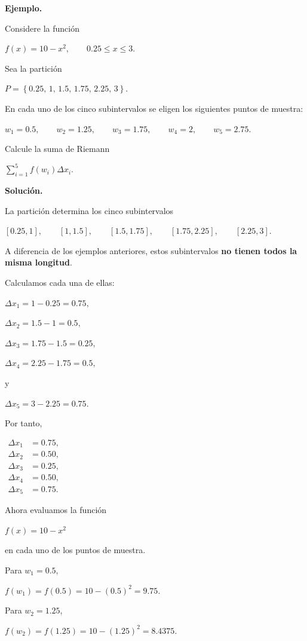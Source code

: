 \documentclass[12pt]{article}
\newenvironment{Ejem}
{\par\medskip\noindent\textbf{Ejemplo.}\ }
{\par\medskip}
\begin{document}
\begin{Ejem}

Considere la función

$
f(x)=10-x^2,
\qquad
0.25\leq x\leq 3.
$

Sea la partición

$
P=
\left\{
0.25,\,
1,\,
1.5,\,
1.75,\,
2.25,\,
3
\right\}.
$

En cada uno de los cinco subintervalos se eligen los siguientes
puntos de muestra:

$
w_1=0.5,
\qquad
w_2=1.25,
\qquad
w_3=1.75,
\qquad
w_4=2,
\qquad
w_5=2.75.
$

Calcule la suma de Riemann

$
\sum_{i=1}^{5}f(w_i)\Delta x_i.
$

\textbf{Solución.}

La partición determina los cinco subintervalos

$
[0.25,1],
\qquad
[1,1.5],
\qquad
[1.5,1.75],
\qquad
[1.75,2.25],
\qquad
[2.25,3].
$

A diferencia de los ejemplos anteriores, estos subintervalos
\textbf{no tienen todos la misma longitud}.

Calculamos cada una de ellas:

$
\Delta x_1
=
1-0.25
=
0.75,
$

$
\Delta x_2
=
1.5-1
=
0.5,
$

$
\Delta x_3
=
1.75-1.5
=
0.25,
$

$
\Delta x_4
=
2.25-1.75
=
0.5,
$

y

$
\Delta x_5
=
3-2.25
=
0.75.
$

Por tanto,

$
\begin{aligned}
\Delta x_1&=0.75,\\
\Delta x_2&=0.50,\\
\Delta x_3&=0.25,\\
\Delta x_4&=0.50,\\
\Delta x_5&=0.75.
\end{aligned}
$

Ahora evaluamos la función

$
f(x)=10-x^2
$

en cada uno de los puntos de muestra.

Para $w_1=0.5$,

$
f(w_1)
=
f(0.5)
=
10-(0.5)^2
=
9.75.
$

Para $w_2=1.25$,

$
f(w_2)
=
f(1.25)
=
10-(1.25)^2
=
8.4375.
$


\end{Ejem}
\end{document}
